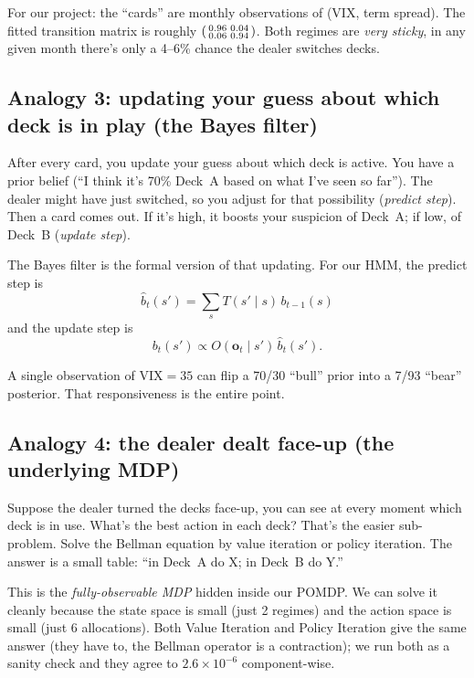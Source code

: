 \documentclass[11pt]{article}
\begin{document}
For our project: the ``cards'' are monthly observations of (VIX, term spread). The fitted transition matrix is roughly $\begin{psmallmatrix} 0.96 & 0.04 \\ 0.06 & 0.94 \end{psmallmatrix}$. Both regimes are \emph{very sticky}, in any given month there's only a 4--6\% chance the dealer switches decks.

\subsection{Analogy 3: updating your guess about which deck is in play (the Bayes filter)}

\begin{analogy}
After every card, you update your guess about which deck is active. You have a prior belief (``I think it's 70\% Deck~A based on what I've seen so far''). The dealer might have just switched, so you adjust for that possibility (\emph{predict step}). Then a card comes out. If it's high, it boosts your suspicion of Deck~A; if low, of Deck~B (\emph{update step}).
\end{analogy}

The Bayes filter is the formal version of that updating. For our HMM, the predict step is
\[
\hat b_t(s') = \sum_s T(s' \mid s)\, b_{t-1}(s)
\]
and the update step is
\[
b_t(s') \propto O(\mathbf{o}_t \mid s')\, \hat b_t(s').
\]

A single observation of VIX$=35$ can flip a 70/30 ``bull'' prior into a 7/93 ``bear'' posterior. That responsiveness is the entire point.

\subsection{Analogy 4: the dealer dealt face-up (the underlying MDP)}

\begin{analogy}
Suppose the dealer turned the decks face-up, you can see at every moment which deck is in use. What's the best action in each deck? That's the easier sub-problem. Solve the Bellman equation by value iteration or policy iteration. The answer is a small table: ``in Deck~A do X; in Deck~B do Y.''
\end{analogy}

This is the \emph{fully-observable MDP} hidden inside our POMDP. We can solve it cleanly because the state space is small (just 2 regimes) and the action space is small (just 6 allocations). Both Value Iteration and Policy Iteration give the same answer (they have to, the Bellman operator is a contraction); we run both as a sanity check and they agree to $2.6 \times 10^{-6}$ component-wise.
\end{document}
